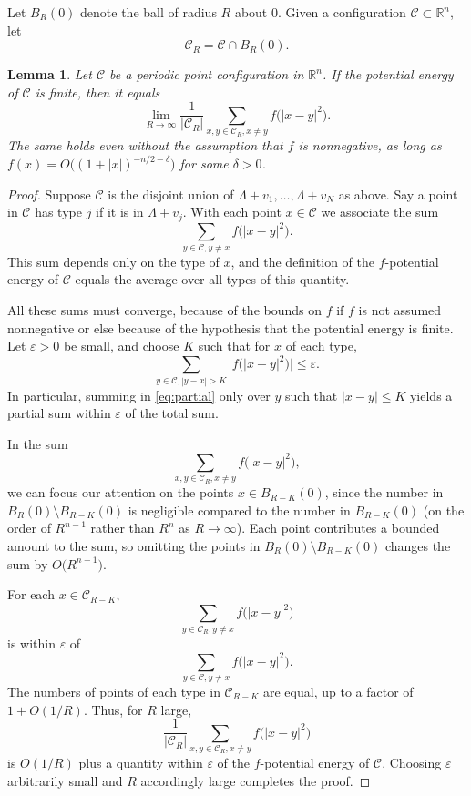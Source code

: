 \documentclass{jams-l}
\theoremstyle{plain}
\newtheorem{lemma}[theorem]{Lemma}
\numberwithin{theorem}{section}
\theoremstyle{definition}
\numberwithin{equation}{section}
\newcommand{\R}{{\mathbb R}}
\begin{document}
Let $B_R(0)$ denote the ball of radius $R$ about $0$. Given a
configuration $\mathcal{C} \subset \R^n$, let
$$
\mathcal{C}_R = \mathcal{C} \cap B_R(0).
$$

\begin{lemma} \label{lemma:limit}
Let $\mathcal{C}$ be a periodic point configuration in $\R^n$. If
the potential energy of $\mathcal{C}$ is finite, then it equals
$$
\lim_{R \to \infty} \frac{1}{|\mathcal{C}_R|} \sum_{x,y \in
\mathcal{C}_R, x \ne y} f\big(|x-y|^2\big).
$$
The same holds even without the assumption that $f$ is
nonnegative, as long as $f(x) = O\big((1+|x|)^{-n/2-\delta}\big)$
for some $\delta>0$.
\end{lemma}

\begin{proof}
Suppose $\mathcal{C}$ is the disjoint union of
$\Lambda+v_1,\dots,\Lambda+v_N$ as above.  Say a point in
$\mathcal{C}$ has type $j$ if it is in $\Lambda+v_j$.  With each
point $x\in \mathcal{C}$ we associate the sum
\begin{equation}\label{eq:partial}
\sum_{y \in \mathcal{C}, y \ne x} f\big(|x-y|^2\big).
\end{equation}
This sum depends only on the type of $x$, and the definition of
the $f$-potential energy of $\mathcal{C}$ equals the average over
all types of this quantity.

All these sums must converge, because of the bounds on $f$ if $f$
is not assumed nonnegative or else because of the hypothesis that
the potential energy is finite. Let $\varepsilon>0$ be small, and
choose $K$ such that for $x$ of each type,
$$
\sum_{y \in \mathcal{C}, |y-x| > K} \big|f\big(|x-y|^2\big)\big|
\le \varepsilon.
$$
In particular, summing in \eqref{eq:partial} only over $y$ such
that $|x-y| \le K$ yields a partial sum within $\varepsilon$ of
the total sum.

In the sum
$$
\sum_{x,y \in \mathcal{C}_R, x \ne y} f\big(|x-y|^2\big),
$$
we can focus our attention on the points $x \in B_{R-K}(0)$, since
the number in $B_R(0) \setminus B_{R-K}(0)$ is negligible compared
to the number in $B_{R-K}(0)$ (on the order of $R^{n-1}$ rather
than $R^n$ as $R \to \infty$).  Each point contributes a bounded
amount to the sum, so omitting the points in $B_R(0) \setminus
B_{R-K}(0)$ changes the sum by $O\big(R^{n-1}\big)$.

For each $x \in \mathcal{C}_{R-K}$,
$$
\sum_{y \in \mathcal{C}_R, y \ne x} f\big(|x-y|^2\big)
$$
is within $\varepsilon$ of
$$
\sum_{y \in \mathcal{C}, y \ne x} f\big(|x-y|^2\big).
$$
The numbers of points of each type in $\mathcal{C}_{R-K}$ are
equal, up to a factor of $1+O(1/R)$.  Thus, for $R$ large,
$$
\frac{1}{|\mathcal{C}_R|} \sum_{x,y \in \mathcal{C}_R, x \ne y}
f\big(|x-y|^2\big)
$$
is $O(1/R)$ plus a quantity within $\varepsilon$ of the
$f$-potential energy of $\mathcal{C}$. Choosing $\varepsilon$
arbitrarily small and $R$ accordingly large completes the proof.
\end{proof}
\end{document}
